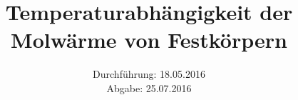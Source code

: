 

\subject{Versuch 47}
\title{Temperaturabhängigkeit der Molwärme von Festkörpern}
\date{Durchführung: 18.05.2016 \\
      Abgabe: 25.07.2016}



\maketitle
\newpage







\printbibliography


